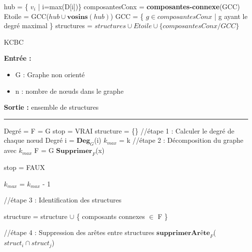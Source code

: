 \documentclass[a4paper,oneside,12pt]{report}
\theoremstyle{definition}
\begin{document}
\begin{appendix}
\begin{algorithm}[H]
\begin{algorithmic} [1]
					\STATE hub = \{ $v_i$ | i=max(D[i])\}
					\STATE composantesConx = \textbf{composantes-connexe}(GCC)
					\STATE Etoile = GCC($hub \cup \textbf{vosins}(hub)$)
					\STATE GCC = \{ $g \in composantesConx$ | g ayant le degré maximal \}
					\STATE structures = $structures \cup Etoile \cup \{composantesConx/GCC\}$
					
					\ENDWHILE
				
				
				\end{algorithmic}
			\end{algorithm}

\newpage

\label{KCBC}


\begin{algorithm}[H]
					\label{alg:KCBC}
					\caption{KCBC}
					\textbf{Entrée :}
						\begin{itemize}[label=$\bullet$]
							\item G : Graphe non orienté
							\item n : nombre de nœuds dans le graphe 
							
						\end{itemize}
					\textbf{Sortie :} ensemble de structures\\							\noindent\rule{\textwidth}{1pt}
						
						
				\begin{algorithmic} [1]
				\STATE Degré = 	\lbrack \rbrack
				\STATE F = G
				\STATE stop = VRAI
				\STATE structure = \{\}
				\STATE //étape 1 : Calculer le degré de chaque nœud
					  \STATE Degré \lbrack i \rbrack = $\textbf{Deg}_G$(i)
					  \ENDFOR
					  \STATE $k_{max}$ = k
						\STATE //étape 2 : Décomposition du graphe avec $k_{max}$
						\STATE F = G
							\STATE $\textbf{Supprimer}_F$(x) 
							\ENDIF
							
						\ENDFOR
						
							\STATE stop = FAUX
						
					\ELSE
						\STATE $k_{max}$ = $k_{max}$ - 1
					\ENDIF
					\ENDWHILE 
					
					
					\STATE //étape 3 : Identification des structures 
					
					\STATE structure = structure $\cup$ \{ composants connexes $ \in $ F \}
					 
					 \STATE //étape 4 : Suppression des arêtes entre structures
					 \STATE $\textbf{supprimerArête}_F$($struct_i \cap struct_j$)   
					 \ENDFOR
				\end{algorithmic}
			\end{algorithm}

\end{appendix}
\newpage






\end{document}
